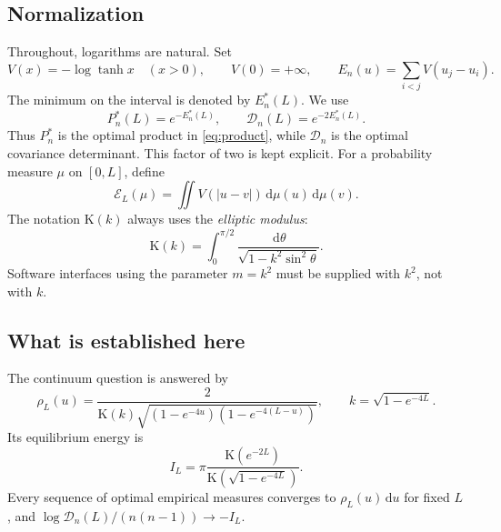 \documentclass[11pt,a4paper]{article}
\theoremstyle{definition}
\theoremstyle{remark}
\newcommand{\dd}{\,\mathrm d}
\newcommand{\E}{\mathcal E}
\newcommand{\Dopt}{\mathcal D}
\newcommand{\K}{\mathrm K}
\begin{document}
\subsection{Normalization}
Throughout, logarithms are natural. Set
\begin{equation}
 V(x)=-\log\tanh x\quad(x>0),\qquad V(0)=+\infty,
 \qquad
 E_n(u)=\sum_{i<j}V(u_j-u_i).
 \label{eq:energy}
\end{equation}
The minimum on the interval is denoted by $E_n^*(L)$. We use
\begin{equation}
 P_n^*(L)=e^{-E_n^*(L)},\qquad
 \Dopt_n(L)=e^{-2E_n^*(L)}.
 \label{eq:PD}
\end{equation}
Thus $P_n^*$ is the optimal product in \eqref{eq:product}, while $\Dopt_n$ is
the optimal covariance determinant. This factor of two is kept explicit.
For a probability measure $\mu$ on $[0,L]$, define
\begin{equation}
 \E_L(\mu)=\iint V(|u-v|)\dd\mu(u)\dd\mu(v).
 \label{eq:continuumenergy}
\end{equation}
The notation $\K(k)$ always uses the \emph{elliptic modulus}:
\begin{equation}
 \K(k)=\int_0^{\pi/2}\frac{\dd\theta}{\sqrt{1-k^2\sin^2\theta}}.
 \label{eq:Kdef}
\end{equation}
Software interfaces using the parameter $m=k^2$ must be supplied with $k^2$,
not with $k$.

\subsection{What is established here}
The continuum question is answered by
\begin{equation}
 \boxed{\displaystyle
 \rho_L(u)=\frac{2}{\K(k)
 \sqrt{(1-e^{-4u})(1-e^{-4(L-u)})}},\qquad
 k=\sqrt{1-e^{-4L}}.}
 \label{eq:main-density}
\end{equation}
Its equilibrium energy is
\begin{equation}
 \boxed{\displaystyle I_L=\pi\frac{\K(e^{-2L})}{\K(\sqrt{1-e^{-4L}})}.}
 \label{eq:main-I}
\end{equation}
Every sequence of optimal empirical measures converges to $\rho_L(u)\dd u$
for fixed $L$, and $\log\Dopt_n(L)/(n(n-1))\to-I_L$.
\end{document}
